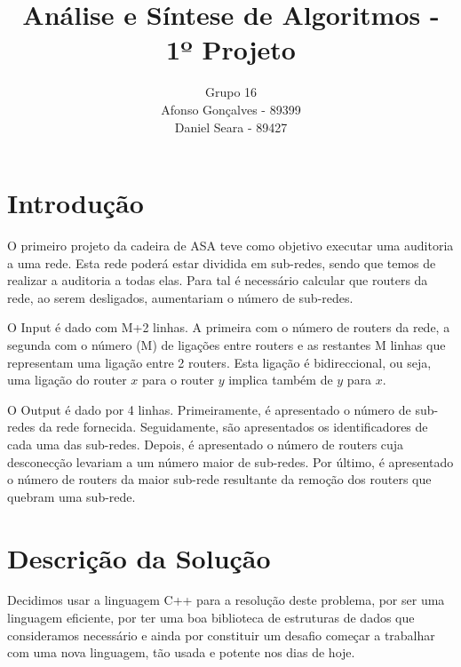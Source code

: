 \documentclass[12pt]{article}
\begin{document}
\title{Análise e Síntese de Algoritmos - 1º Projeto}
\author{Grupo 16 \\ Afonso Gonçalves - 89399 \\ Daniel Seara - 89427}
\date{}
\maketitle


\thispagestyle{fancy}


\section{Introdução}

O primeiro projeto da cadeira de ASA teve como objetivo executar uma auditoria a uma rede. Esta rede poderá estar dividida em sub-redes, 
sendo que temos de realizar a auditoria a todas elas. Para tal é necessário calcular que routers da rede, ao serem desligados, aumentariam o número de
sub-redes.\par

O Input é dado com M+2 linhas. A primeira com o número de routers da rede, a segunda com o número (M) de ligações entre routers e as restantes M linhas que 
representam uma ligação entre 2 routers. Esta ligação é bidireccional, ou seja, uma ligação do router $x$ para o router $y$ implica também de 
$y$ para $x$.\par

O Output é dado por 4 linhas. Primeiramente, é apresentado o número de sub-redes da rede fornecida. Seguidamente, são apresentados os identificadores de cada 
uma das sub-redes. Depois, é apresentado o número de routers cuja desconecção levariam a um número maior de sub-redes. Por último, é apresentado o número de routers 
da maior sub-rede resultante da remoção dos routers que quebram uma sub-rede.\par

\section{Descrição da Solução}


    Decidimos usar a linguagem C++ para a resolução deste problema,
    por ser uma linguagem eficiente, por ter uma boa biblioteca de estruturas de dados 
    que consideramos necessário e ainda por constituir um desafio começar a trabalhar 
    com uma nova linguagem, tão usada e potente nos dias de hoje.
\end{document}
